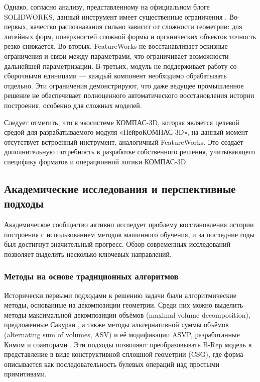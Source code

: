 Однако, согласно анализу, представленному на официальном блоге SOLIDWORKS, данный инструмент имеет существенные ограничения \cite{solidxperts2025featureworks}. Во-первых, качество распознавания сильно зависит от сложности геометрии: для литейных форм, поверхностей сложной формы и органических объектов точность резко снижается. Во-вторых, FeatureWorks не восстанавливает эскизные ограничения и связи между параметрами, что ограничивает возможности дальнейшей параметризации. В-третьих, модуль не поддерживает работу со сборочными единицами — каждый компонент необходимо обрабатывать отдельно. Эти ограничения демонстрируют, что даже ведущее промышленное решение не обеспечивает полноценного автоматического восстановления истории построения, особенно для сложных моделей.

Следует отметить, что в экосистеме КОМПАС-3D, которая является целевой средой для разрабатываемого модуля «НейроКОМПАС-3D», на данный момент отсутствует встроенный инструмент, аналогичный FeatureWorks. Это создаёт дополнительную потребность в разработке собственного решения, учитывающего специфику форматов и операционной логики КОМПАС-3D.

\subsection{Академические исследования и перспективные подходы}

Академическое сообщество активно исследует проблему восстановления истории построения с использованием методов машинного обучения, и за последние годы был достигнут значительный прогресс. Обзор современных исследований позволяет выделить несколько ключевых направлений.

\subsubsection{Методы на основе традиционных алгоритмов}

Исторически первыми подходами к решению задачи были алгоритмические методы, основанные на декомпозиции геометрии. Среди них можно выделить методы максимальной декомпозиции объёмов (maximal volume decomposition), предложенные Сакураи \cite{sakurai1998maximal}, а также методы альтернативной суммы объёмов (alternating sum of volumes, ASV) и её модификации ASVP, разработанные Кимом и соавторами \cite{kim2000asvp}. Эти подходы позволяют преобразовывать B-Rep модель в представление в виде конструктивной сплошной геометрии (CSG), где форма описывается как последовательность булевых операций над простыми примитивами.

